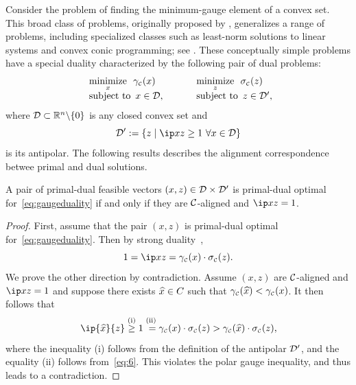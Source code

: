 Consider the problem of finding the minimum-gauge element of a convex set. This
broad class of problems, originally proposed by \citet{freund1987dual},
generalizes a range of problems, including specialized classes such as least-norm
solutions to linear systems and convex conic programming; see
\citet{friedlander2014gauge,aravkin2018foundations}. These conceptually simple
problems have a special duality characterized by the following pair of dual
problems:
\begin{equation}   \label{eq:gaugeduality}
  \begin{array}{l@{\enspace}l}
    &\minimize{x}  \gauge\Cs(x)\\ 
    &\mbox{subject to}\enspace  x\in \Dscr,
  \end{array}
  \qquad
  \begin{array}{l@{\enspace}l}
    &\minimize{z}  \sigma\Cs(z)\\
    &\mbox{subject to}\enspace  z\in \Dscr',
  \end{array}
\end{equation}
where $\mathcal{D}\subset\mathbb{R}^n\backslash\{0\}$ is any closed convex set and
\[\Dscr':=\{z \mid \ip x z \ge 1\ \forall x\in\Dscr\}\] is its antipolar.
The following results describes the alignment correspondence betwee primal and
dual solutions.

\begin{proposition} \label{prop:polar-duality}
  A pair of primal-dual feasible vectors
    $(x,z)\in\mathcal{D}\times\mathcal{D}'$ is primal-dual optimal
    for~\eqref{eq:gaugeduality} if and only if they are
    $\mathcal{C}$-aligned and $\ip x z = 1$.
\end{proposition}

\begin{proof}
  First, assume that the pair $(x,z)$ is primal-dual optimal
  for~\eqref{eq:gaugeduality}. Then by strong
  duality~\cite[Corollary~5.2]{friedlander2014gauge},
  \begin{equation} \label{eq:6}
    1 = \ip x z = \gauge\Cs(x)\cdot\sigma\Cs(z).
  \end{equation}
  We prove the other direction by contradiction. Assume $(x,z)$ are
  $\mathcal{C}$-aligned and $\ip x z = 1$ and suppose there exists $\xhat \in C$ such
  that $\gauge\Cs(\xhat) < \gauge\Cs(x)$. It then follows that
  \[
    \ip{\xhat}{z} \overset{\rm(i)}{\geq} 1 
    \overset{\rm(ii)}{\vphantom{\ge}=} \gauge\Cs(x)\cdot\sigma\Cs(z) > \gauge\Cs(\xhat )\cdot\sigma\Cs(z),\]
  where the inequality (i) follows from the definition of the
  antipolar $\mathcal{D}'$, and the equality (ii) follows
  from~\eqref{eq:6}. This violates the polar gauge inequality, and
  thus leads to a contradiction.
\end{proof}

